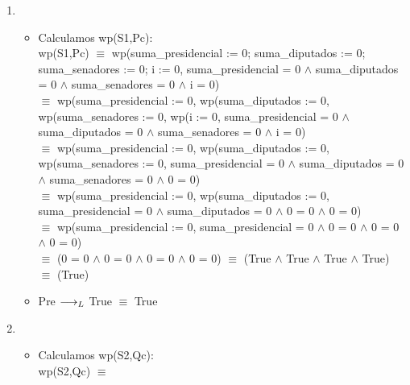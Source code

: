 \documentclass[10pt,a4paper]{article}
\begin{document}
\begin{enumerate}

    \item \begin{itemize}
        \item Calculamos wp(S1,Pc): \\
        
        wp(S1,Pc) $\equiv$ wp(suma\_presidencial := 0; suma\_diputados := 0; suma\_senadores := 0; i := 0, suma\_presidencial = 0 $\land$ suma\_diputados = 0 $\land$ suma\_senadores = 0 $\land$ i = 0) \\ 
        
        $\equiv$ wp(suma\_presidencial := 0, wp(suma\_diputados := 0, wp(suma\_senadores := 0, wp(i := 0, suma\_presidencial = 0 $\land$ suma\_diputados = 0 $\land$ suma\_senadores = 0 $\land$ i = 0) \\

        $\equiv$ wp(suma\_presidencial := 0, wp(suma\_diputados := 0, wp(suma\_senadores := 0, suma\_presidencial = 0 $\land$ suma\_diputados = 0 $\land$ suma\_senadores = 0 $\land$ 0 = 0) \\
        
        $\equiv$ wp(suma\_presidencial := 0, wp(suma\_diputados := 0,  suma\_presidencial = 0 $\land$ suma\_diputados = 0 $\land$ 0 = 0 $\land$ 0 = 0) \\
        
        $\equiv$ wp(suma\_presidencial := 0,   suma\_presidencial = 0 $\land$ 0 = 0 $\land$ 0 = 0 $\land$ 0 = 0) \\
        
        $\equiv$ (0 = 0 $\land$ 0 = 0 $\land$ 0 = 0 $\land$ 0 = 0) 
        $\equiv$ (True $\land$ True $\land$ True $\land$ True) 
        $\equiv$ (True)
    
        \vspace{5mm}
        \item Pre $\longrightarrow _L$ True $\equiv$ True
        
    \end{itemize}

    \item \begin{itemize}
        \item Calculamos wp(S2,Qc): \\

        wp(S2,Qc) $\equiv$ 
        
    \end{itemize}


\end{enumerate}
\end{document}
